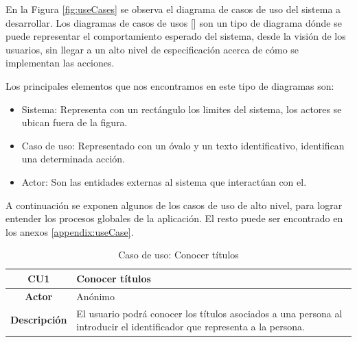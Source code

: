 En la Figura \ref{fig:useCases} se observa el diagrama de casos de uso del sistema a desarrollar. Los diagramas de casos de usos [\cite{91}] son un tipo de diagrama dónde se puede representar el comportamiento esperado del sistema, desde la visión de los usuarios, sin llegar a un alto nivel de especificación acerca de cómo se implementan las acciones. 


Los principales elementos que nos encontramos en este tipo de diagramas son:
\begin{itemize}
\item Sistema: Representa con un rectángulo los limites del sistema, los actores se ubican fuera de la figura.
\item Caso de uso: Representado con un óvalo y un texto identificativo, identifican una determinada acción.
\item Actor: Son las entidades externas al sistema que interactúan con el.
\end{itemize}

A continuación se exponen algunos de los casos de uso de alto nivel, para lograr entender los procesos globales de la aplicación. El resto puede ser encontrado en los anexos \ref{appendix:useCase}.

\begin{table}[!h]
	\begin{center}
		\begin{tabular}{|c|p{10cm}|}
		\hline \textbf{CU1} & Conocer títulos \\ 
		\hline \textbf{Actor} & Anónimo \\ 
		\hline \textbf{Descripción} & El usuario podrá conocer los títulos asociados a una persona al introducir el identificador que representa a la persona.  \\ 
		\hline 
		\end{tabular}
		\caption{Caso de uso: Conocer títulos}
		\label{tab:CU1}
	\end{center}
\end{table}

